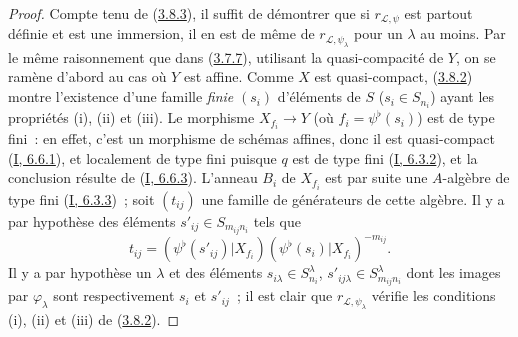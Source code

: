 
\begin{proof}
Compte tenu de (\hyperref[II.3.8.3-fr]{3.8.3}), il suffit de démontrer que si
$r_{\mathcal{L},\psi}$ est partout définie et est une immersion, il en est de
même de $r_{\mathcal{L},\psi_\lambda}$ pour un $\lambda$ au moins. Par le
même raisonnement que dans (\hyperref[II.3.7.7-fr]{3.7.7}), utilisant la
quasi-compacité de $Y$, on se ramène d'abord au cas où $Y$ est affine. Comme
$X$ est quasi-compact, (\hyperref[II.3.8.2-fr]{3.8.2}) montre l'existence
d'une famille \emph{finie} $(s_i)$ d'éléments de $S$ ($s_i\in S_{n_i}$)
ayant les propriétés (i), (ii) et (iii). Le morphisme $X_{f_i}\to Y$ (où
$f_i=\psi^\flat(s_i)$) est de type fini~: en effet, c'est un morphisme de
schémas affines, donc il est quasi-compact
(\hyperref[I.6.6.1-fr]{I, 6.6.1}), et localement de type fini puisque $q$ est
de type fini (\hyperref[I.6.3.2-fr]{I, 6.3.2}), et la conclusion résulte de
(\hyperref[I.6.6.3-fr]{I, 6.6.3}). L'anneau $B_i$ de $X_{f_i}$ est par suite
une $A$-algèbre de type fini (\hyperref[I.6.3.3-fr]{I, 6.3.3})~; soit
$(t_{ij})$ une famille de générateurs de cette algèbre. Il y a par hypothèse
des éléments $s'_{ij}\in S_{m_{ij}n_i}$ tels que
\[
  t_{ij}=(\psi^\flat(s'_{ij})|X_{f_i})
  (\psi^\flat(s_i)|X_{f_i})^{-m_{ij}}.
\]
Il y a par hypothèse un $\lambda$ et des éléments
$s_{i\lambda}\in S_{n_i}^\lambda$,
$s'_{ij\lambda}\in S_{m_{ij}n_i}^\lambda$ dont les images par
$\varphi_\lambda$ sont respectivement $s_i$ et $s'_{ij}$~; il est clair que
$r_{\mathcal{L},\psi_\lambda}$ vérifie les conditions (i), (ii) et (iii) de
(\hyperref[II.3.8.2-fr]{3.8.2}).
\end{proof}


